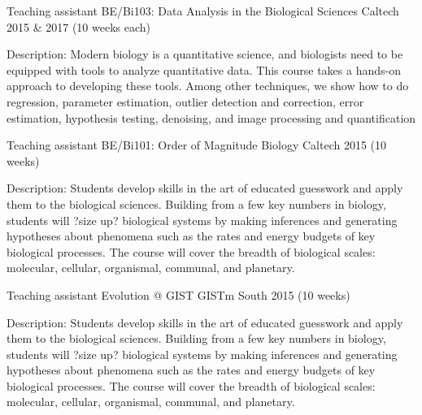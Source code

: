 \begin{cventries}
  \cventry
    {Teaching assistant} %
    {BE/Bi103: Data Analysis in the Biological Sciences} %
    {Caltech} %
    {2015 \& 2017 (10 weeks each)} %
    {
      \begin{cvitems} %
        \item {Description: Modern biology is a quantitative science, and
        biologists need to be equipped with tools to analyze quantitative data.
        This course takes a hands-on approach to developing these tools. Among
        other techniques, we show how to do regression, parameter estimation,
        outlier detection and correction, error estimation, hypothesis testing,
        denoising, and image processing and quantification}
      \end{cvitems}
    }

  \cventry
    {Teaching assistant} %
    {BE/Bi101: Order of Magnitude Biology} %
    {Caltech} %
    {2015 (10 weeks)} %
    {
      \begin{cvitems} %
        \item {Description: Students develop skills in the art of educated
        guesswork and apply them to the biological sciences. Building from a
        few key numbers in biology, students will ?size up? biological systems
        by making inferences and generating hypotheses about phenomena such as
        the rates and energy budgets of key biological processes. The course
        will cover the breadth of biological scales: molecular, cellular,
        organismal, communal, and planetary.}
      \end{cvitems}
    }

  \cventry
    {Teaching assistant} %
    {Evolution @ GIST} %
    {GISTm South} %
    {2015 (10 weeks)} %
    {
      \begin{cvitems} %
        \item {Description: Students develop skills in the art of educated
        guesswork and apply them to the biological sciences. Building from a
        few key numbers in biology, students will ?size up? biological systems
        by making inferences and generating hypotheses about phenomena such as
        the rates and energy budgets of key biological processes. The course
        will cover the breadth of biological scales: molecular, cellular,
        organismal, communal, and planetary.}
      \end{cvitems}
    }


\end{cventries}

